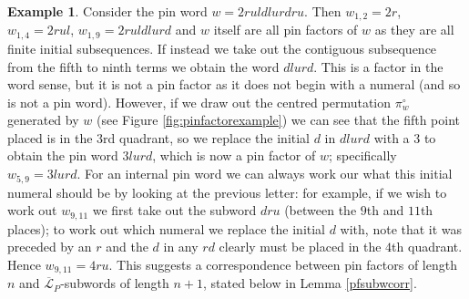 \documentclass[11pt,a4paper]{article}
\newcommand{\plotptradius}{4pt}
\theoremstyle{definition}
\newtheorem{example}[thm]{Example}
\begin{document}
\begin{example}
Consider the pin word $w = 2ruldlurdru$. Then $w_{1,2} = 2r$, $w_{1,4} = 2rul$, $w_{1,9} = 2ruldlurd$ and $w$ itself are all pin factors of $w$ as they are all finite initial subsequences. If instead we take out the contiguous subsequence from the fifth to ninth terms we obtain the word $dlurd$. This is a factor in the word sense, but it is not a pin factor as it does not begin with a numeral (and so is not a pin word). However, if we draw out the centred permutation $\pi_{w}^{\circ}$ generated by $w$ (see Figure \ref{fig:pinfactorexample}) we can see that the fifth point placed is in the $3$rd quadrant, so we replace the initial $d$ in $dlurd$ with a $3$ to obtain the pin word $3lurd$, which is now a pin factor of $w$; specifically $w_{5,9} = 3lurd$. For an internal pin word we can always work our what this initial numeral should be by looking at the previous letter: for example, if we wish to work out $w_{9,11}$ we first take out the subword $dru$ (between the $9$th and $11$th places); to work out which numeral we replace the initial $d$ with, note that it was preceded by an $r$ and the $d$ in any $rd$ clearly must be placed in the $4$th quadrant. Hence $w_{9,11} = 4ru$. This suggests a correspondence between pin factors of length $n$ and $\overline{\mathcal{L}}_{P}$-subwords of length $n+1$, stated below in Lemma \ref{pfsubwcorr}.

\begin{figure}[h]
\begin{center}
\end{center}
\end{figure}
\end{example}
\end{document}
